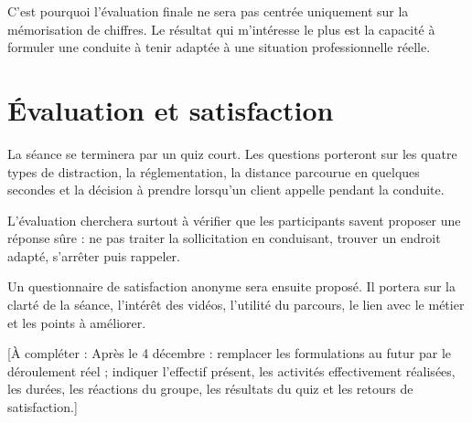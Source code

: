 C’est pourquoi l’évaluation finale ne sera pas centrée uniquement sur la mémorisation de chiffres. Le résultat qui m’intéresse le plus est la capacité à formuler une conduite à tenir adaptée à une situation professionnelle réelle.

\begingroup\color{red}
\section{Évaluation et satisfaction}

La séance se terminera par un quiz court. Les questions porteront sur les quatre types de distraction, la réglementation, la distance parcourue en quelques secondes et la décision à prendre lorsqu’un client appelle pendant la conduite.

L’évaluation cherchera surtout à vérifier que les participants savent proposer une réponse sûre : ne pas traiter la sollicitation en conduisant, trouver un endroit adapté, s’arrêter puis rappeler.

Un questionnaire de satisfaction anonyme sera ensuite proposé. Il portera sur la clarté de la séance, l’intérêt des vidéos, l’utilité du parcours, le lien avec le métier et les points à améliorer.

[À compléter : Après le 4 décembre : remplacer les formulations au futur par le déroulement réel ; indiquer l’effectif présent, les activités effectivement réalisées, les durées, les réactions du groupe, les résultats du quiz et les retours de satisfaction.]
\endgroup

